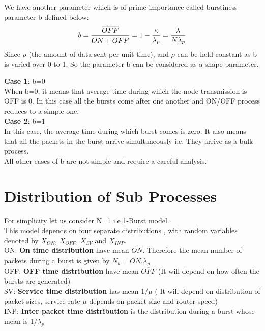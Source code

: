We have another parameter which is of prime importance called burstiness parameter b defined below:\\

\begin{equation}
b = \frac{\overline{OFF}}{\overline{ON} + \overline{OFF}} = 1 - \frac{\kappa}{{\lambda}_p} = \frac{\lambda}{N{\lambda}_p}\\
\end{equation}
Since $\rho$ (the amount of data sent per unit time), and $\rho$ can be held constant as b is varied over 0 to 1. So the parameter b can be considered as a shape parameter.

\textbf{Case 1}: b=0 \\
When b=0, it means that average time during which the node transmission is OFF is 0. In this case all the bursts come after one another and ON/OFF process reduces to a simple one.\\

\textbf{Case 2}: b=1\\
In this case, the average time during which burst comes is zero. It also means that all the packets in the burst arrive simultaneously i.e. They arrive as a bulk process.\\ 

All other cases of b are not simple and require a careful analysis.\\

\section{Distribution of Sub Processes}

For simplicity let us consider N=1 i.e 1-Burst model.\\
This model depends on four separate distributions , with random variables denoted by $X_{ON}$, $X_{OFF}$, $X_{SV}$ and $X_{INP}$.\\
ON: \textbf{On time distribution} have mean $\overline{ON}$. Therefore the mean number of packets during a burst is given by $N_{b} =  \overline{ON}.\lambda_{p}$  \\
OFF: \textbf{OFF time distribution} have mean $\overline{OFF}$ (It will depend on how often the bursts are generated) \\
SV: \textbf{Service time distribution} has mean 1/$\mu$ ( It will depend on distribution of packet sizes, service rate $\mu$ depends on packet size and router speed)\\
INP: \textbf{Inter packet time distribution} is the distribution during a burst whose mean is 1/$\lambda_{p}$ \\

